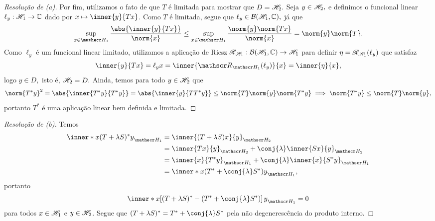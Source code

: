 \begin{proof}[Resolução de (a)]
  Por fim, utilizamos o fato de que \(T\) é limitada para mostrar que \(D = \mathscr{H}_2.\) Seja \(y \in \mathscr{H}_2,\) e definimos o funcional linear \(\ell_y : \mathscr{H}_1 \to \mathbb{C}\) dado por \( x \mapsto \inner{y}{Tx}\). Como \(T\) é limitada, segue que \(\ell_y \in \mathcal{B}(\mathscr{H}_1, \mathbb{C}),\) já que
  \begin{equation*}
    \sup_{x \in \hilbert_1}{\frac{\abs{\inner{y}{Tx}}}{\norm{x}}} \leq \sup_{x \in \hilbert_1}{\frac{\norm{y} \norm{Tx}}{\norm{x}}} = \norm{y} \norm{T}.
  \end{equation*}
  Como \(\ell_y\) é um funcional linear limitado, utilizamos a aplicação de Riesz \(\mathscr{R}_{\mathscr{H}_1} : \mathcal{B}(\mathscr{H}_1, \mathbb{C}) \to \mathscr{H}_1\) para definir \(\eta = \mathscr{R}_{\mathscr{H}_1}(\ell_y)\) que satisfaz
  \begin{equation*}
    \inner{y}{Tx} = \ell_yx = \inner{\riesz_{\hilbert_1}(\ell_y)}{x} = \inner{\eta}{x},
  \end{equation*}
  logo \(y \in D,\) isto é, \(\mathscr{H}_2 = D.\) Ainda, temos para todo \(y \in \mathscr{H}_2\) que
  \begin{equation*}
    \norm{T^*y}^2 = \abs{\inner{T^*y}{T^*y}} = \abs{\inner{y}{TT^*y}} \leq \norm{T} \norm{y} \norm{T^* y} \implies \norm{T^*y} \leq \norm{T}\norm{y},
  \end{equation*}
  portanto \(T^*\) é uma aplicação linear bem definida e limitada.
\end{proof}
\begin{proof}[Resolução de (b)]
  Temos
  \begin{align*}
    \inner*{x}{(T + \lambda S)^*y}_{\hilbert_1} &= \inner{(T + \lambda S)x}{y}_{\hilbert_2}\\
                                               &= \inner{Tx}{y}_{\hilbert_2} + \conj{\lambda} \inner{Sx}{y}_{\hilbert_2}\\
                                               &= \inner{x}{T^*y}_{\hilbert_1} + \conj{\lambda} \inner{x}{S^*y}_{\hilbert_1}\\
                                               &= \inner*{x}{(T^* + \conj{\lambda} S^*)y}_{\hilbert_1},
  \end{align*}
  portanto
  \begin{equation*}
    \inner*{x}{\left[(T + \lambda S)^* - (T^* + \conj{\lambda} S^*)\right]y}_{\hilbert_1} = 0
  \end{equation*}
  para todos \(x \in \mathscr{H}_1\) e \(y \in \mathscr{H}_2\). Segue que \((T + \lambda S)^* = T^* + \conj{\lambda} S^*\) pela não degenerescência do produto interno.
\end{proof}

